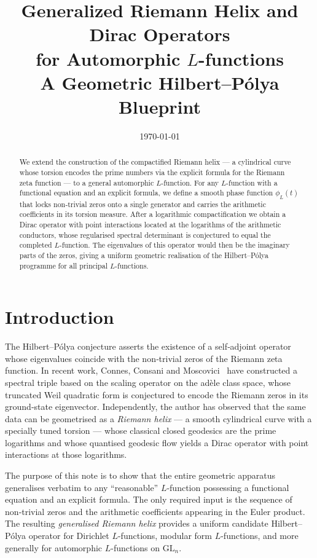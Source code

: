 \documentclass[12pt,a4paper]{article}
\title{\textbf{Generalized Riemann Helix and Dirac Operators\\[0.3em]
for Automorphic \(L\)-functions}\\[0.5em]
\large A Geometric Hilbert--P\'olya Blueprint}
\author{}
\date{\today}
\begin{document}
\maketitle

\begin{abstract}
We extend the construction of the compactified Riemann helix --- a cylindrical curve whose torsion encodes the prime numbers via the explicit formula for the Riemann zeta function --- to a general automorphic \(L\)-function. For any \(L\)-function with a functional equation and an explicit formula, we define a smooth phase function \(\phi_L(t)\) that locks non‑trivial zeros onto a single generator and carries the arithmetic coefficients in its torsion measure. After a logarithmic compactification we obtain a Dirac operator with point interactions located at the logarithms of the arithmetic conductors, whose regularised spectral determinant is conjectured to equal the completed \(L\)-function. The eigenvalues of this operator would then be the imaginary parts of the zeros, giving a uniform geometric realisation of the Hilbert--P\'olya programme for all principal \(L\)-functions.
\end{abstract}

\section{Introduction}

The Hilbert--P\'olya conjecture asserts the existence of a self‑adjoint operator whose eigenvalues coincide with the non‑trivial zeros of the Riemann zeta function. In recent work, Connes, Consani and Moscovici~\cite{CCM2025} have constructed a spectral triple based on the scaling operator on the adèle class space, whose truncated Weil quadratic form is conjectured to encode the Riemann zeros in its ground‑state eigenvector. Independently, the author has observed that the same data can be geometrised as a \emph{Riemann helix} --- a smooth cylindrical curve with a specially tuned torsion --- whose classical closed geodesics are the prime logarithms and whose quantised geodesic flow yields a Dirac operator with point interactions at those logarithms.

The purpose of this note is to show that the entire geometric apparatus generalises verbatim to any ``reasonable'' \(L\)-function possessing a functional equation and an explicit formula. The only required input is the sequence of non‑trivial zeros and the arithmetic coefficients appearing in the Euler product. The resulting \emph{generalised Riemann helix} provides a uniform candidate Hilbert--P\'olya operator for Dirichlet \(L\)-functions, modular form \(L\)-functions, and more generally for automorphic \(L\)-functions on \(\mathrm{GL}_n\).
\end{document}
